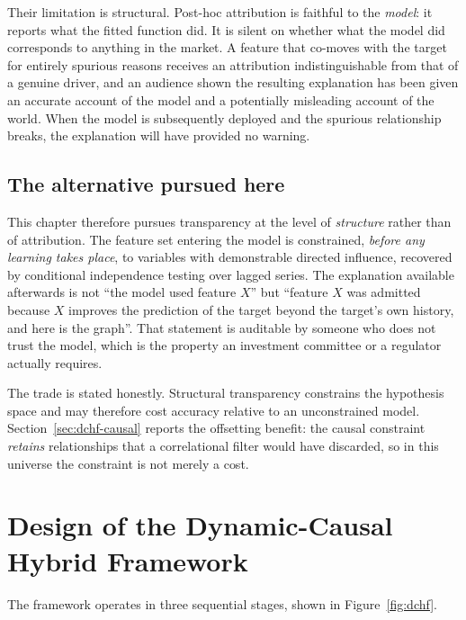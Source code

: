 Their limitation is structural. Post-hoc attribution is faithful to the \emph{model}: it reports
what the fitted function did. It is silent on whether what the model did corresponds to anything
in the market. A feature that co-moves with the target for entirely spurious reasons receives an
attribution indistinguishable from that of a genuine driver, and an audience shown the resulting
explanation has been given an accurate account of the model and a potentially misleading account
of the world. When the model is subsequently deployed and the spurious relationship breaks, the
explanation will have provided no warning.

\subsection{The alternative pursued here}

This chapter therefore pursues transparency at the level of \emph{structure} rather than of
attribution. The feature set entering the model is constrained, \emph{before any learning takes
place}, to variables with demonstrable directed influence, recovered by conditional independence
testing over lagged series. The explanation available afterwards is not ``the model used feature
$X$'' but ``feature $X$ was admitted because $X$ improves the prediction of the target beyond the
target's own history, and here is the graph''. That statement is auditable by someone who does not
trust the model, which is the property an investment committee or a regulator actually requires.

The trade is stated honestly. Structural transparency constrains the hypothesis space and may
therefore cost accuracy relative to an unconstrained model. Section~\ref{sec:dchf-causal} reports
the offsetting benefit: the causal constraint \emph{retains} relationships that a correlational
filter would have discarded, so in this universe the constraint is not merely a cost.

\section{Design of the Dynamic-Causal Hybrid Framework}
\label{sec:dchf-design}

The framework operates in three sequential stages, shown in Figure~\ref{fig:dchf}.

